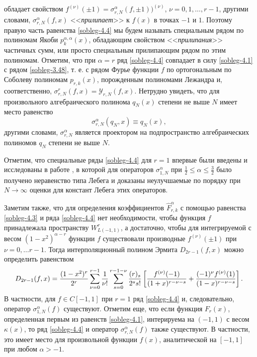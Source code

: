 обладает свойством $f^{(\nu)}(\pm1)=\sigma_{r,N}^\alpha(f,\pm1))^{(\nu)}$, $\nu=0,1,\ldots, r-1$, другими словами, $\sigma_{r,N}^\alpha(f,x)$ <<\textit{прилипает}>> к $f(x)$ в точках $-1$ и $1$. Поэтому правую часть  равенства \eqref{sobleg-4.4} мы будем называть специальным рядом по полиномам Якоби $p_{k}^{\alpha,\alpha}(x)$, обладающим свойством <<\textit{прилипания}>> частичных сумм, или просто специальным прилипающим рядом по этим  полиномам.  Отметим, что при $\alpha=r$ ряд \eqref{sobleg-4.4} совпадает в силу \eqref{sobleg-4.1} с рядом \eqref{sobleg-3.48}, т. е. с рядом Фурье функции $f$ по ортогональным по Соболеву полиномам $p_{r,k}(x)$, порожденным полиномами Лежандра и, соответственно, $\sigma_{r,N}^r(f,x)=\mathcal{ Y}_{r,N}(f,x)$. Нетрудно увидеть, что для произвольного алгебраического полинома $q_N(x)$ степени не выше $N$ имеет место равенство
\begin{equation}\label{sobleg-4.6}
\sigma_{r,N}^\alpha(q_N,x)\equiv q_N(x),
\end{equation}
другими словами, $\sigma_{r,N}^\alpha$ является проектором на подпространство алгебраических полиномов $q_N$ степени не выше $N$.

Отметим, что специальные ряды \eqref{sobleg-4.4} для $r=1$ впервые были введены и исследованы в работе \cite{sobleg-sharap3}, в которой для операторов $\sigma_{1,N}^\alpha$  при $\frac12\le \alpha\le\frac32$ было получено неравенство типа Лебега и доказаны неулучшаемые по порядку при $N\to\infty$ оценки для констант Лебега этих операторов.

Заметим также, что для определения коэффициентов $\hat F^\alpha_{r,k}$  с помощью равенства \eqref{sobleg-4.3} и ряда \eqref{sobleg-4.4} нет необходимости, чтобы функция $f$ принадлежала пространству $W^r_{L(-1,1)}$, а достаточно, чтобы для интегрируемой с весом $(1-x^2)^{\alpha-r}$ функции $f$ существовали производные $f^{(\nu)}(\pm1)$ при $\nu=0,\ldots r-1$. Тогда  интерполяционный полином Эрмита $D_{2r-1}(f,x)$ можно определить равенством
\begin{equation}\label{sobleg-4.7}
D_{2r-1}(f,x)=
{(1-x^2)^r\over2^r}\sum_{\nu=0}^{r-1}{1\over\nu!}
\sum_{s=0}^{r-1-\nu}{(r)_s\over2^ss!}\left[{f^{(\nu)}(-1)\over(1+x)^{r-\nu-s}}+
{(-1)^\nu f^{(\nu)}(1)\over(1-x)^{r-\nu-s}}\right].
\end{equation}
В частности, для $f\in C[-1,1]$ при $r=1$ ряд \eqref{sobleg-4.4} и, следовательно,  оператор $\sigma_{1,N}^\alpha(f)$ существуют. Отметим еще, что если функция $F_r(x)$, определенная первым из равенств \eqref{sobleg-4.1}, интерируема на $(-1,1)$ с весом $\kappa(x)$, то ряд \eqref{sobleg-4.4} и оператор $\sigma_{r,N}^\alpha(f)$ также существуют. В частности, это имеет место для  произвольной функции $f(x)$, аналитической на $[-1,1]$ при любом $\alpha>-1$.





